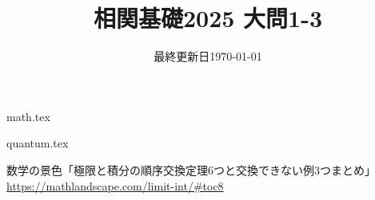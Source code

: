 \documentclass{jlreq}
\title{相関基礎2025 大問1-3}
\author{\emoji{deciduous-tree}}
\date{最終更新日\today }
\begin{document}
\maketitle
  
{math.tex}

\pagebreak

{quantum.tex}
  
\begin{thebibliography}{99}
    数学の景色「極限と積分の順序交換定理6つと交換できない例3つまとめ」\url{https://mathlandscape.com/limit-int/#toc8}
\end{thebibliography}
  
\end{document}
